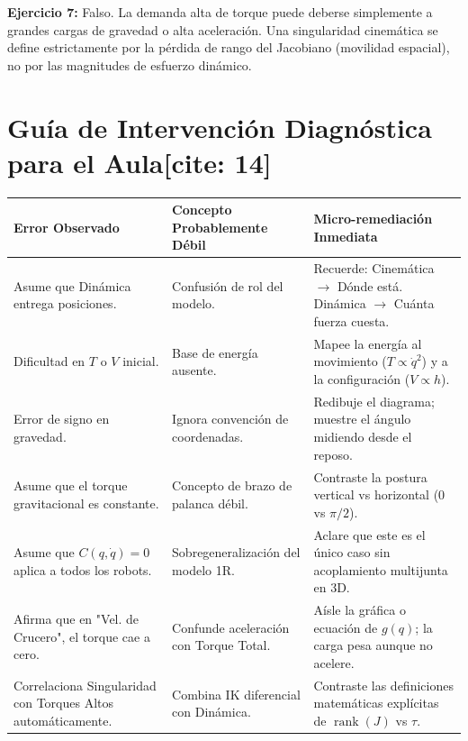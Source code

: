 \documentclass[11pt, a4paper]{article}
\begin{document}
\textbf{Ejercicio 7:} Falso. La demanda alta de torque puede deberse simplemente a grandes cargas de gravedad o alta aceleración. Una singularidad cinemática se define estrictamente por la pérdida de rango del Jacobiano (movilidad espacial), no por las magnitudes de esfuerzo dinámico.

\vspace{0.5cm}
\section*{Guía de Intervención Diagnóstica para el Aula[cite: 14]}
\renewcommand{\arraystretch}{1.4}
\begin{tabularx}{\textwidth}{|>{\hsize=0.85\hsize}X|>{\hsize=0.9\hsize}X|>{\hsize=1.25\hsize}X|}
\hline
\rowcolor{gray!20} \textbf{Error Observado} & \textbf{Concepto Probablemente Débil} & \textbf{Micro-remediación Inmediata} \\ \hline
Asume que Dinámica entrega posiciones. & Confusión de rol del modelo. & Recuerde: Cinemática $\to$ Dónde está. Dinámica $\to$ Cuánta fuerza cuesta. \\ \hline
Dificultad en $T$ o $V$ inicial. & Base de energía ausente. & Mapee la energía al movimiento ($T \propto \dot{q}^2$) y a la configuración ($V \propto h$). \\ \hline
Error de signo en gravedad. & Ignora convención de coordenadas. & Redibuje el diagrama; muestre el ángulo midiendo desde el reposo. \\ \hline
Asume que el torque gravitacional es constante. & Concepto de brazo de palanca débil. & Contraste la postura vertical vs horizontal ($0$ vs $\pi/2$). \\ \hline
Asume que $C(q,\dot{q})=0$ aplica a todos los robots. & Sobregeneralización del modelo 1R. & Aclare que este es el único caso sin acoplamiento multijunta en 3D. \\ \hline
Afirma que en "Vel. de Crucero", el torque cae a cero. & Confunde aceleración con Torque Total. & Aísle la gráfica o ecuación de $g(q)$; la carga pesa aunque no acelere. \\ \hline
Correlaciona Singularidad con Torques Altos automáticamente. & Combina IK diferencial con Dinámica. & Contraste las definiciones matemáticas explícitas de $\operatorname{rank}(J)$ vs $\tau$. \\ \hline
\end{tabularx}
\end{document}
